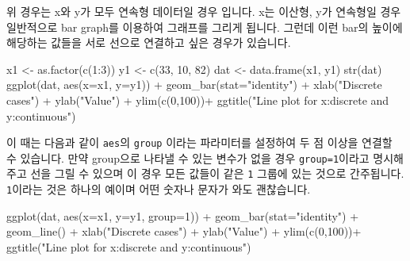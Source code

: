 \documentclass[
]{book}
\newenvironment{Shaded}{\begin{snugshade}}{\end{snugshade}}
\newcommand{\AttributeTok}[1]{\textcolor[rgb]{0.77,0.63,0.00}{#1}}
\newcommand{\DecValTok}[1]{\textcolor[rgb]{0.00,0.00,0.81}{#1}}
\newcommand{\FunctionTok}[1]{\textcolor[rgb]{0.00,0.00,0.00}{#1}}
\newcommand{\NormalTok}[1]{#1}
\newcommand{\OtherTok}[1]{\textcolor[rgb]{0.56,0.35,0.01}{#1}}
\newcommand{\SpecialCharTok}[1]{\textcolor[rgb]{0.00,0.00,0.00}{#1}}
\newcommand{\StringTok}[1]{\textcolor[rgb]{0.31,0.60,0.02}{#1}}
\begin{document}
위 경우는 x와 y가 모두 연속형 데이터일 경우 입니다. x는 이산형, y가 연속형일 경우 일반적으로 bar graph를 이용하여 그래프를 그리게 됩니다. 그런데 이런 bar의 높이에 해당하는 값들을 서로 선으로 연결하고 싶은 경우가 있습니다.

\begin{Shaded}
\begin{Highlighting}[]
\NormalTok{x1 }\OtherTok{\textless{}{-}} \FunctionTok{as.factor}\NormalTok{(}\FunctionTok{c}\NormalTok{(}\DecValTok{1}\SpecialCharTok{:}\DecValTok{3}\NormalTok{))}
\NormalTok{y1 }\OtherTok{\textless{}{-}} \FunctionTok{c}\NormalTok{(}\DecValTok{33}\NormalTok{, }\DecValTok{10}\NormalTok{, }\DecValTok{82}\NormalTok{)}
\NormalTok{dat }\OtherTok{\textless{}{-}} \FunctionTok{data.frame}\NormalTok{(x1, y1)}
\FunctionTok{str}\NormalTok{(dat)}
\FunctionTok{ggplot}\NormalTok{(dat, }\FunctionTok{aes}\NormalTok{(}\AttributeTok{x=}\NormalTok{x1, }\AttributeTok{y=}\NormalTok{y1)) }\SpecialCharTok{+}
  \FunctionTok{geom\_bar}\NormalTok{(}\AttributeTok{stat=}\StringTok{"identity"}\NormalTok{) }\SpecialCharTok{+}
  \FunctionTok{xlab}\NormalTok{(}\StringTok{"Discrete cases"}\NormalTok{) }\SpecialCharTok{+} \FunctionTok{ylab}\NormalTok{(}\StringTok{"Value"}\NormalTok{) }\SpecialCharTok{+}
  \FunctionTok{ylim}\NormalTok{(}\FunctionTok{c}\NormalTok{(}\DecValTok{0}\NormalTok{,}\DecValTok{100}\NormalTok{))}\SpecialCharTok{+}
  \FunctionTok{ggtitle}\NormalTok{(}\StringTok{"Line plot for x:discrete and y:continuous"}\NormalTok{)}
\end{Highlighting}
\end{Shaded}

이 때는 다음과 같이 \texttt{aes}의 \texttt{group} 이라는 파라미터를 설정하여 두 점 이상을 연결할 수 있습니다. 만약 group으로 나타낼 수 있는 변수가 없을 경우 \texttt{group=1}이라고 명시해 주고 선을 그릴 수 있으며 이 경우 모든 값들이 같은 \texttt{1} 그룹에 있는 것으로 간주됩니다. \texttt{1}이라는 것은 하나의 예이며 어떤 숫자나 문자가 와도 괜찮습니다.

\begin{Shaded}
\begin{Highlighting}[]
\FunctionTok{ggplot}\NormalTok{(dat, }\FunctionTok{aes}\NormalTok{(}\AttributeTok{x=}\NormalTok{x1, }\AttributeTok{y=}\NormalTok{y1, }\AttributeTok{group=}\DecValTok{1}\NormalTok{)) }\SpecialCharTok{+}
  \FunctionTok{geom\_bar}\NormalTok{(}\AttributeTok{stat=}\StringTok{"identity"}\NormalTok{) }\SpecialCharTok{+}
  \FunctionTok{geom\_line}\NormalTok{() }\SpecialCharTok{+}
  \FunctionTok{xlab}\NormalTok{(}\StringTok{"Discrete cases"}\NormalTok{) }\SpecialCharTok{+} \FunctionTok{ylab}\NormalTok{(}\StringTok{"Value"}\NormalTok{) }\SpecialCharTok{+}
  \FunctionTok{ylim}\NormalTok{(}\FunctionTok{c}\NormalTok{(}\DecValTok{0}\NormalTok{,}\DecValTok{100}\NormalTok{))}\SpecialCharTok{+}
  \FunctionTok{ggtitle}\NormalTok{(}\StringTok{"Line plot for x:discrete and y:continuous"}\NormalTok{)}
\end{Highlighting}
\end{Shaded}
\end{document}
